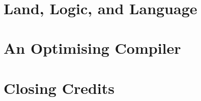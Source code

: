 \documentclass[11pt,a4paper,draft,oneside,openany]{memoir}
\begin{document}
\frontmatter

 \clearpage

\maketitle
~
\vspace{3cm}
  \begin{abstract}

  \end{abstract}

\setlength{\cftpartnumwidth}{4em}

\clearpage
\tableofcontents*
\newpage

\mainmatter
{}


\part{Land, Logic, and Language}







\part{An Optimising Compiler}















\clearpage

\part{Closing Credits}

{}
\printbibliography

\backmatter
\appendix

\end{document}
